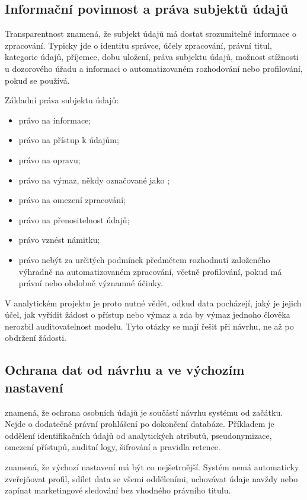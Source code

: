 \subsection{Informační povinnost a práva subjektů údajů}
Transparentnost znamená, že subjekt údajů má dostat srozumitelné informace o zpracování. Typicky jde
o identitu správce, účely zpracování, právní titul, kategorie údajů, příjemce, dobu uložení, práva
subjektu údajů, možnost stížnosti u dozorového úřadu a informaci o automatizovaném rozhodování nebo
profilování, pokud se používá.

Základní práva subjektu údajů:
\begin{itemize}
  \item právo na informace;
  \item právo na přístup k údajům;
  \item právo na opravu;
  \item právo na výmaz, někdy označované jako ;
  \item právo na omezení zpracování;
  \item právo na přenositelnost údajů;
  \item právo vznést námitku;
  \item právo nebýt za určitých podmínek předmětem rozhodnutí založeného výhradně na automatizovaném
  zpracování, včetně profilování, pokud má právní nebo obdobně významné účinky.
\end{itemize}

V analytickém projektu je proto nutné vědět, odkud data pocházejí, jaký je jejich účel, jak vyřídit
žádost o přístup nebo výmaz a zda by výmaz jednoho člověka nerozbil auditovatelnost modelu. Tyto
otázky se mají řešit při návrhu, ne až po obdržení žádosti.

\subsection{Ochrana dat od návrhu a ve výchozím nastavení}
 znamená, že ochrana osobních údajů je součástí návrhu systému od začátku.
Nejde o dodatečné právní prohlášení po dokončení databáze. Příkladem je oddělení identifikačních
údajů od analytických atributů, pseudonymizace, omezení přístupů, auditní logy, šifrování a pravidla
retence.

 znamená, že výchozí nastavení má být co nejšetrnější. Systém nemá automaticky
zveřejňovat profil, sdílet data se všemi odděleními, uchovávat údaje navždy nebo zapínat marketingové
sledování bez vhodného právního titulu.

